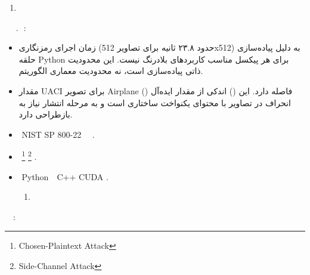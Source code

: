 \begin{enumerate}
\def\labelenumi{\arabic{enumi}.}
\setcounter{enumi}{4}
\item
  \protect{}\label{_Toc232899936}{}‌ 
\end{enumerate}

    ‌ ‌    ‌ ‌     ‌. ‌     :

\begin{itemize}
\item
  زمان اجرای رمزنگاری (حدود ۲۳.۸ ثانیه برای تصاویر 512x512) به دلیل پیاده‌سازی حلقه Python برای هر پیکسل مناسب کاربردهای بلادرنگ نیست. این محدودیت ذاتی پیاده‌سازی است، نه محدودیت معماری الگوریتم.
\item
  مقدار UACI برای تصویر Airplane (‎‎) اندکی از مقدار ایده‌آل (‎‎) فاصله دارد. این انحراف در تصاویر با محتوای یکنواخت ساختاری است و به مرحله انتشار نیاز به بازطراحی دارد.
\item
  ‌ NIST SP 800-22    ‌ ‌      ‌       .
\item
       ‌    \footnote{Chosen-Plaintext Attack}    \footnote{Side-Channel Attack}      .
\item
  ‌    Python     ‌   ‌   C++  CUDA     .

  \begin{enumerate}
  \def\labelenumi{\arabic{enumi}.}
  \item
    \protect{}\label{_Toc232899937}{}   
  \end{enumerate}
\end{itemize}

  ‌    ‌ ‌       ‌:

